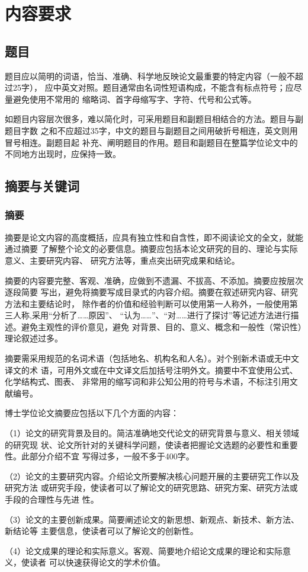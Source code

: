 \documentclass[fontset=windows,type=bachelor,campus=harbin]{hithesisart}
\begin{document}
\tableofcontents    %

\section{内容要求}
\subsection{题目}

题目应以简明的词语，恰当、准确、科学地反映论文最重要的特定内容（一般不超过25字），
应中英文对照。题目通常由名词性短语构成，不能含有标点符号；应尽量避免使用不常用的
缩略词、首字母缩写字、字符、代号和公式等。

如题目内容层次很多，难以简化时，可采用题目和副题目相结合的方法。题目与副题目字数
之和不应超过35字，中文的题目与副题目之间用破折号相连，英文则用冒号相连。副题目起
补充、阐明题目的作用。题目和副题目在整篇学位论文中的不同地方出现时，应保持一致。

\subsection{摘要与关键词}
\subsubsection{摘要}

摘要是论文内容的高度概括，应具有独立性和自含性，即不阅读论文的全文，就能通过摘要
了解整个论文的必要信息。摘要应包括本论文研究的目的、理论与实际意义、主要研究内容、
研究方法等，重点突出研究成果和结论。

摘要的内容要完整、客观、准确，应做到不遗漏、不拔高、不添加。摘要应按层次逐段简要
写出，避免将摘要写成目录式的内容介绍。摘要在叙述研究内容、研究方法和主要结论时，
除作者的价值和经验判断可以使用第一人称外，一般使用第三人称,采用“分析了……原因”、
“认为……”、“对……进行了探讨”等记述方法进行描述。避免主观性的评价意见，避免
对背景、目的、意义、概念和一般性（常识性）理论叙述过多。

摘要需采用规范的名词术语（包括地名、机构名和人名）。对个别新术语或无中文译文的术
语，可用外文或在中文译文后加括号注明外文。摘要中不宜使用公式、化学结构式、图表、
非常用的缩写词和非公知公用的符号与术语，不标注引用文献编号。

博士学位论文摘要应包括以下几个方面的内容：

（1）论文的研究背景及目的。简洁准确地交代论文的研究背景与意义、相关领域的研究现
状、论文所针对的关键科学问题，使读者把握论文选题的必要性和重要性。此部分介绍不宜
写得过多，一般不多于400字。

（2）论文的主要研究内容。介绍论文所要解决核心问题开展的主要研究工作以及研究方法
或研究手段，使读者可以了解论文的研究思路、研究方案、研究方法或手段的合理性与先进
性。

（3）论文的主要创新成果。简要阐述论文的新思想、新观点、新技术、新方法、新结论等
主要信息，使读者可以了解论文的创新性。

（4）论文成果的理论和实际意义。客观、简要地介绍论文成果的理论和实际意义，使读者
可以快速获得论文的学术价值。
\end{document}
